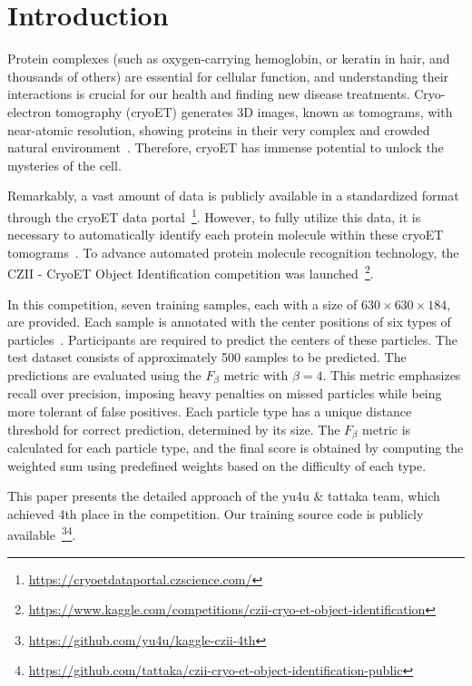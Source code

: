 \section{Introduction}
\label{sec:introduction}

Protein complexes (such as oxygen-carrying hemoglobin, or keratin in hair, and thousands of others) are essential for cellular function, and understanding their interactions is crucial for our health and finding new disease treatments. Cryo-electron tomography (cryoET) generates 3D images, known as tomograms, with near-atomic resolution, showing proteins in their very complex and crowded natural environment~\cite{Young2023}. Therefore, cryoET has immense potential to unlock the mysteries of the cell.

Remarkably, a vast amount of data is publicly available in a standardized format through the cryoET data portal~\footnote{\url{https://cryoetdataportal.czscience.com/}}.
However, to fully utilize this data, it is necessary to automatically identify each protein molecule within these cryoET tomograms~\cite{Peck2024}.
To advance automated protein molecule recognition technology, the CZII - CryoET Object Identification competition was launched~\footnote{\url{https://www.kaggle.com/competitions/czii-cryo-et-object-identification}}.

In this competition, seven training samples, each with a size of $630 \times 630 \times 184$, are provided.
Each sample is annotated with the center positions of six types of particles~\cite{Peck2024}.  
Participants are required to predict the centers of these particles.  
The test dataset consists of approximately 500 samples to be predicted.
The predictions are evaluated using the $F_\beta$ metric with $\beta = 4$.
This metric emphasizes recall over precision, imposing heavy penalties on missed particles while being more tolerant of false positives.
Each particle type has a unique distance threshold for correct prediction, determined by its size.
The $F_\beta$ metric is calculated for each particle type, and the final score is obtained by computing the weighted sum using predefined weights based on the difficulty of each type.

This paper presents the detailed approach of the yu4u \& tattaka team, which achieved 4th place in the competition.
Our training source code is publicly available~\footnote{\url{https://github.com/yu4u/kaggle-czii-4th}}\footnote{\url{https://github.com/tattaka/czii-cryo-et-object-identification-public}}.
